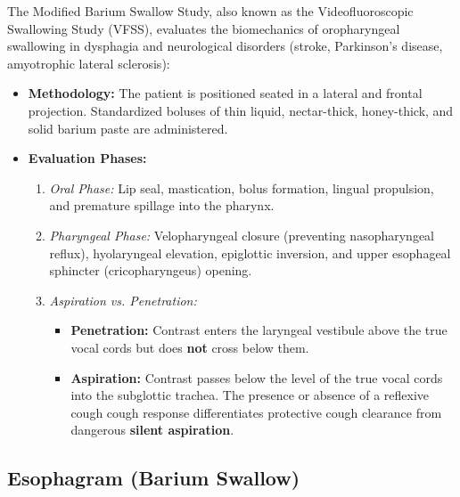 \documentclass[11pt,a4paper]{article}
\begin{document}
The Modified Barium Swallow Study, also known as the Videofluoroscopic Swallowing Study (VFSS), evaluates the biomechanics of oropharyngeal swallowing in dysphagia and neurological disorders (stroke, Parkinson's disease, amyotrophic lateral sclerosis):
\begin{itemize}[leftmargin=*]
    \item \textbf{Methodology:} The patient is positioned seated in a lateral and frontal projection. Standardized boluses of thin liquid, nectar-thick, honey-thick, and solid barium paste are administered.
    \item \textbf{Evaluation Phases:}
    \begin{enumerate}
        \item \textit{Oral Phase:} Lip seal, mastication, bolus formation, lingual propulsion, and premature spillage into the pharynx.
        \item \textit{Pharyngeal Phase:} Velopharyngeal closure (preventing nasopharyngeal reflux), hyolaryngeal elevation, epiglottic inversion, and upper esophageal sphincter (cricopharyngeus) opening.
        \item \textit{Aspiration vs. Penetration:}
        \begin{itemize}
            \item \textbf{Penetration:} Contrast enters the laryngeal vestibule above the true vocal cords but does \textbf{not} cross below them.
            \item \textbf{Aspiration:} Contrast passes below the level of the true vocal cords into the subglottic trachea. The presence or absence of a reflexive cough cough response differentiates protective cough clearance from dangerous \textbf{silent aspiration}.
        \end{itemize}
    \end{enumerate}
\end{itemize}

\subsection{Esophagram (Barium Swallow)}
\end{document}
